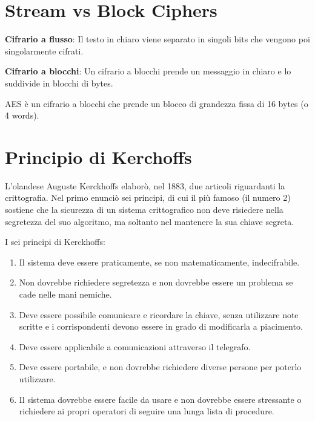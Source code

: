 \section{Stream vs Block Ciphers}

       

\textsf{\small \textbf{Cifrario a flusso}: Il testo in chiaro viene separato in singoli bits che vengono poi singolarmente cifrati.} 

\textsf{\small \textbf{Cifrario a blocchi}: Un cifrario a blocchi prende un messaggio in chiaro e lo suddivide in blocchi di bytes.} 

\textsf{\small  AES è un cifrario a blocchi che prende un blocco di grandezza fissa di 16 bytes (o 4 words).}


\section{Principio di Kerchoffs}


\textsf{\small L'olandese Auguste Kerckhoffs elaborò, nel 1883, due articoli riguardanti la crittografia. Nel primo enunciò sei principi, di cui il più famoso (il numero 2) sostiene che la sicurezza di un sistema crittografico non deve risiedere nella segretezza del suo algoritmo, ma soltanto nel mantenere la sua chiave segreta.} %

\textsf{\small I sei principi di Kerckhoffs:}


\begin{enumerate}
	\item \textsf{\small Il sistema deve essere praticamente, se non matematicamente, indecifrabile.} %
	\item \textsf{\small Non dovrebbe richiedere segretezza e non dovrebbe essere un problema se cade nelle mani nemiche.} %
	\item \textsf{\small Deve essere possibile comunicare e ricordare la chiave, senza utilizzare note scritte e i corrispondenti devono essere in grado di modificarla a piacimento.} %
	\item \textsf{\small Deve essere applicabile a comunicazioni attraverso il telegrafo.} %
	\item \textsf{\small  Deve essere portabile, e non dovrebbe richiedere diverse persone per poterlo utilizzare.} %
	\item \textsf{\small Il sistema dovrebbe essere facile da usare e non dovrebbe essere stressante o richiedere ai propri operatori di seguire una lunga lista di procedure.} %
\end{enumerate}


